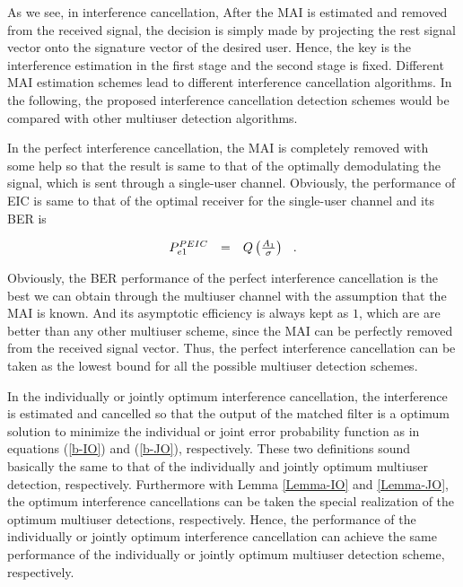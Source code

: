 \documentclass[a4paper,12pt,fleqn]{article}
\begin{document}
As we see, in interference cancellation, After the MAI is
estimated and removed from the received signal, the decision is
simply made by projecting the rest signal vector onto the
signature vector of the desired user. Hence, the key is the
interference estimation in the first stage and the second stage is
fixed. Different MAI estimation schemes lead to different
interference cancellation algorithms. In the following, the
proposed interference cancellation detection schemes would be
compared with other multiuser detection algorithms.

In the perfect interference cancellation, the MAI is completely
removed with some help so that the result is same to that of the
optimally demodulating the signal, which is sent through a
single-user channel. Obviously, the performance of EIC is same to
that of the optimal receiver for the single-user channel and its
BER is

\begin{equation}
\begin{array}{rcl}
P_{e1}^{PEIC}&=&Q\left({A_1 \over \sigma}\right) \hspace{0.1in}.
\end{array}
\end{equation}

Obviously, the BER performance of the perfect interference
cancellation is the best we can obtain through the multiuser
channel with the assumption that the MAI is known. And its
asymptotic efficiency is always kept as $1$, which are are better
than any other multiuser scheme, since the MAI can be perfectly
removed from the received signal vector. Thus, the perfect
interference cancellation can be taken as the lowest bound for all
the possible multiuser detection schemes.

In the individually or jointly optimum interference cancellation,
the interference is estimated and cancelled so that the output of
the matched filter is a optimum solution to minimize the
individual or joint error probability function as in equations
(\ref{b-IO}) and (\ref{b-JO}), respectively. These two definitions
sound basically the same to that of the individually and jointly
optimum multiuser detection, respectively. Furthermore with Lemma
\ref{Lemma-IO} and \ref{Lemma-JO}, the optimum interference
cancellations can be taken the special realization of the optimum
multiuser detections, respectively. Hence, the performance of the
individually or jointly optimum interference cancellation can
achieve the same performance of the individually or jointly
optimum multiuser detection scheme, respectively.
\end{document}
